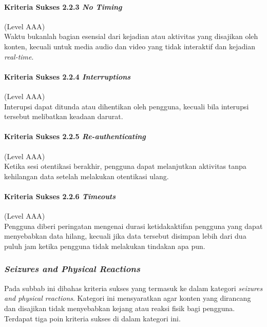 \paragraph{Kriteria Sukses 2.2.3 \textit{No Timing}}
\label{sec:kriteria_sukses_2.2.3}
(Level AAA)\\

Waktu bukanlah bagian esensial dari kejadian atau aktivitas yang disajikan oleh konten, kecuali untuk media audio dan video yang tidak interaktif dan kejadian \textit{real-time}.

\paragraph{Kriteria Sukses 2.2.4 \textit{Interruptions}}
\label{sec:kriteria_sukses_2.2.4}
(Level AAA)\\

Interupsi dapat ditunda atau dihentikan oleh pengguna, kecuali bila interupsi tersebut melibatkan keadaan darurat.

\paragraph{Kriteria Sukses 2.2.5 \textit{Re-authenticating}}
\label{sec:kriteria_sukses_2.2.5}
(Level AAA)\\

Ketika sesi otentikasi berakhir, pengguna dapat melanjutkan aktivitas tanpa kehilangan data setelah melakukan otentikasi ulang.

\paragraph{Kriteria Sukses 2.2.6 \textit{Timeouts}}
\label{sec:kriteria_sukses_2.2.6}
(Level AAA)\\

Pengguna diberi peringatan mengenai durasi ketidakaktifan pengguna yang dapat menyebabkan data hilang, kecuali jika data tersebut disimpan lebih dari dua puluh jam ketika pengguna tidak melakukan tindakan apa pun.

\subsubsection{\textit{Seizures and Physical Reactions}}
\label{sec:seizures_and_physical_reactions}
Pada subbab ini dibahas kriteria sukses yang termasuk ke dalam kategori \textit{seizures and physical reactions}. Kategori ini mensyaratkan agar konten yang dirancang dan disajikan tidak menyebabkan kejang atau reaksi fisik bagi pengguna. Terdapat tiga poin kriteria sukses di dalam kategori ini.


